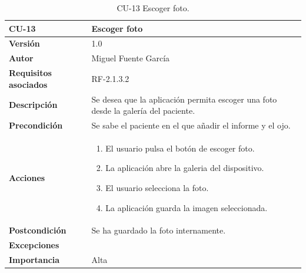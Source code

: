 \begin{table}[p]
	\centering
	\begin{tabularx}{\linewidth}{ p{} p{} }
		\toprule
		\textbf{CU-13}    & \textbf{Escoger foto}\\
		\toprule
		\textbf{Versión}              & 1.0    \\
		\textbf{Autor}                & Miguel Fuente García \\
		\textbf{Requisitos asociados} & RF-2.1.3.2 \\
		\textbf{Descripción}          & Se desea que la aplicación permita escoger una foto desde la galería del paciente. \\
		\textbf{Precondición}         & Se sabe el paciente en el que añadir el informe y el ojo. \\
		\textbf{Acciones}             &
		\begin{enumerate}
			\def\labelenumi{\arabic{enumi}.}
			\tightlist
			\item El usuario pulsa el botón de escoger foto.
            \item La aplicación abre la galeria del dispositivo.
            \item El usuario selecciona la foto.
            \item La aplicación guarda la imagen seleccionada.
		\end{enumerate}\\
		\textbf{Postcondición}        & Se ha guardado la foto internamente. \\
		\textbf{Excepciones}          &  \\
		\textbf{Importancia}          & Alta  \\
		\bottomrule
	\end{tabularx}
	\caption{CU-13 Escoger foto.}
\end{table}

